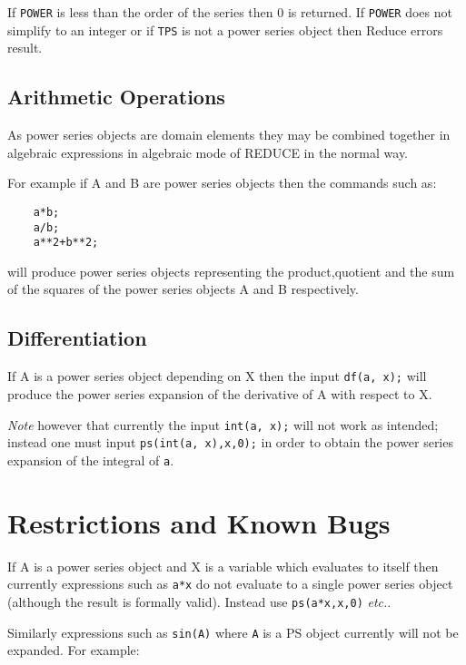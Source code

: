 If {\tt POWER} is less than the order of the series then $0$ is
returned.  If {\tt POWER} does not simplify to an integer or if 
{\tt TPS} is not a power series object then Reduce errors result.

\subsection{Arithmetic Operations}

As power series objects are domain elements they may be combined
together in algebraic expressions in algebraic mode of REDUCE in the
normal way.
 
For example if A and B are power series objects then the commands
such as:

 
 
\begin{verbatim}
    a*b;
    a/b;
    a**2+b**2;
\end{verbatim}

will produce power series objects representing the product,quotient
and the sum of the squares of the power series objects A and B
respectively.
 
\subsection{Differentiation}

If A is a power series object depending on X then the input
{\tt df(a, x);} will produce the power series expansion of the
derivative of A with respect to X.

{\em Note} however that currently the input  {\tt int(a, x);} will
not work as intended; instead one must input
{\tt ps(int(a, x),x,0);}
in order to obtain the power series expansion of the integral of
{\tt a}.

\section{Restrictions and Known Bugs}

If A is a power series object and X is a variable
which evaluates to itself then currently expressions such as {\tt a*x}
do not evaluate to a single power series object (although the 
result is formally valid).  Instead use {\tt ps(a*x,x,0)} {\em etc.}.

Similarly expressions such as {\tt sin(A)} where {\tt A} is a PS object
currently will not be expanded. For example:

